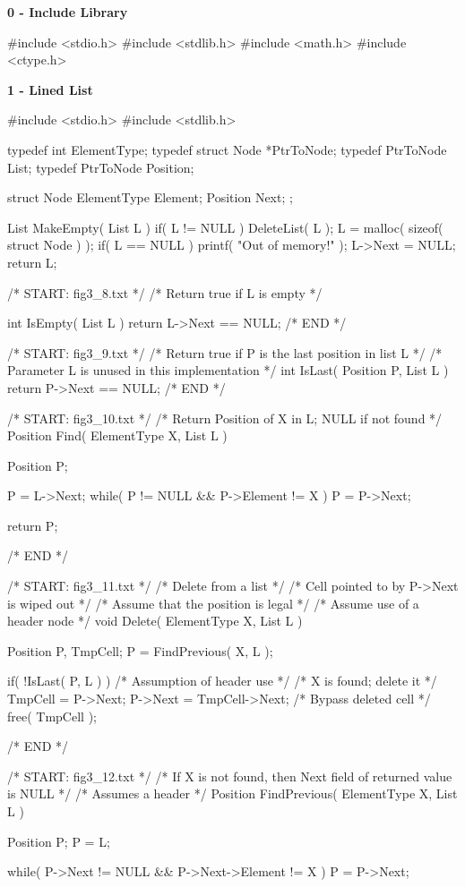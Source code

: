 \documentclass[12pt, a4paper]{article}
\begin{document}
\huge\textbf{0 - Include Library}
\begin{code}
#include <stdio.h>
#include <stdlib.h>
#include <math.h>
#include <ctype.h>
\end{code}

\Huge\textbf{1 - Lined List}
\begin{code}
#include <stdio.h>
#include <stdlib.h>

typedef int ElementType;
typedef struct Node *PtrToNode;
typedef PtrToNode List;
typedef PtrToNode Position;

struct Node
{
    ElementType Element;
    Position Next;
};

List MakeEmpty( List L )
{
    if( L != NULL )
        DeleteList( L );
    L = malloc( sizeof( struct Node ) );
    if( L == NULL )
        printf( "Out of memory!" );
    L->Next = NULL;
    return L;
}

/* START: fig3_8.txt */
/* Return true if L is empty */

int IsEmpty( List L )
{
    return L->Next == NULL;
}
/* END */

/* START: fig3_9.txt */
/* Return true if P is the last position in list L */
/* Parameter L is unused in this implementation */
int IsLast( Position P, List L )
{
    return P->Next == NULL;
}
/* END */

/* START: fig3_10.txt */
/* Return Position of X in L; NULL if not found */
Position Find( ElementType X, List L )
{
    Position P;

    P = L->Next;
    while( P != NULL && P->Element != X )
        P = P->Next;
    
    return P;
}
/* END */

/* START: fig3_11.txt */
/* Delete from a list */
/* Cell pointed to by P->Next is wiped out */
/* Assume that the position is legal */
/* Assume use of a header node */
void Delete( ElementType X, List L )
{
    Position P, TmpCell;
    P = FindPrevious( X, L );

    if( !IsLast( P, L ) )  /* Assumption of header use */
    {                      /* X is found; delete it */
        TmpCell = P->Next;
        P->Next = TmpCell->Next;  /* Bypass deleted cell */
        free( TmpCell );
    }
}
/* END */

/* START: fig3_12.txt */
/* If X is not found, then Next field of returned value is NULL */
/* Assumes a header */
Position FindPrevious( ElementType X, List L )
{
    Position P;
    P = L;

    while( P->Next != NULL && P->Next->Element != X )
        P = P->Next;
    
}
\end{code}
\end{document}
